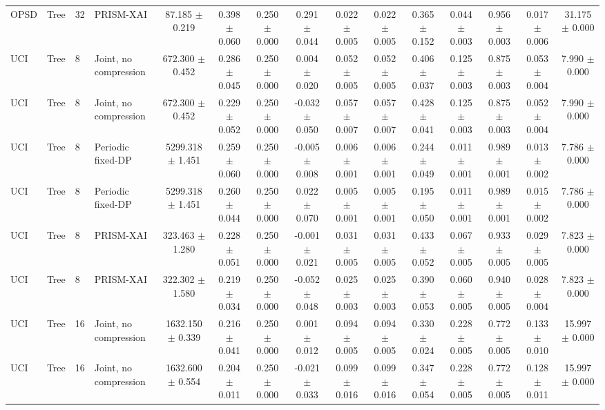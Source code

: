 \begin{tabular}{llllccccccccccc}
OPSD & Tree & 32 & PRISM-XAI & 87.185 $\pm$ 0.219 & 0.398 $\pm$ 0.060 & 0.250 $\pm$ 0.000 & 0.291 $\pm$ 0.044 & 0.022 $\pm$ 0.005 & 0.022 $\pm$ 0.005 & 0.365 $\pm$ 0.152 & 0.044 $\pm$ 0.003 & 0.956 $\pm$ 0.003 & 0.017 $\pm$ 0.006 & 31.175 $\pm$ 0.000 \\
UCI & Tree & 8 & Joint, no compression & 672.300 $\pm$ 0.452 & 0.286 $\pm$ 0.045 & 0.250 $\pm$ 0.000 & 0.004 $\pm$ 0.020 & 0.052 $\pm$ 0.005 & 0.052 $\pm$ 0.005 & 0.406 $\pm$ 0.037 & 0.125 $\pm$ 0.003 & 0.875 $\pm$ 0.003 & 0.053 $\pm$ 0.004 & 7.990 $\pm$ 0.000 \\
UCI & Tree & 8 & Joint, no compression & 672.300 $\pm$ 0.452 & 0.229 $\pm$ 0.052 & 0.250 $\pm$ 0.000 & -0.032 $\pm$ 0.050 & 0.057 $\pm$ 0.007 & 0.057 $\pm$ 0.007 & 0.428 $\pm$ 0.041 & 0.125 $\pm$ 0.003 & 0.875 $\pm$ 0.003 & 0.052 $\pm$ 0.004 & 7.990 $\pm$ 0.000 \\
UCI & Tree & 8 & Periodic fixed-DP & 5299.318 $\pm$ 1.451 & 0.259 $\pm$ 0.060 & 0.250 $\pm$ 0.000 & -0.005 $\pm$ 0.008 & 0.006 $\pm$ 0.001 & 0.006 $\pm$ 0.001 & 0.244 $\pm$ 0.049 & 0.011 $\pm$ 0.001 & 0.989 $\pm$ 0.001 & 0.013 $\pm$ 0.002 & 7.786 $\pm$ 0.000 \\
UCI & Tree & 8 & Periodic fixed-DP & 5299.318 $\pm$ 1.451 & 0.260 $\pm$ 0.044 & 0.250 $\pm$ 0.000 & 0.022 $\pm$ 0.070 & 0.005 $\pm$ 0.001 & 0.005 $\pm$ 0.001 & 0.195 $\pm$ 0.050 & 0.011 $\pm$ 0.001 & 0.989 $\pm$ 0.001 & 0.015 $\pm$ 0.002 & 7.786 $\pm$ 0.000 \\
UCI & Tree & 8 & PRISM-XAI & 323.463 $\pm$ 1.280 & 0.228 $\pm$ 0.051 & 0.250 $\pm$ 0.000 & -0.001 $\pm$ 0.021 & 0.031 $\pm$ 0.005 & 0.031 $\pm$ 0.005 & 0.433 $\pm$ 0.052 & 0.067 $\pm$ 0.005 & 0.933 $\pm$ 0.005 & 0.029 $\pm$ 0.005 & 7.823 $\pm$ 0.000 \\
UCI & Tree & 8 & PRISM-XAI & 322.302 $\pm$ 1.580 & 0.219 $\pm$ 0.034 & 0.250 $\pm$ 0.000 & -0.052 $\pm$ 0.048 & 0.025 $\pm$ 0.003 & 0.025 $\pm$ 0.003 & 0.390 $\pm$ 0.053 & 0.060 $\pm$ 0.005 & 0.940 $\pm$ 0.005 & 0.028 $\pm$ 0.004 & 7.823 $\pm$ 0.000 \\
UCI & Tree & 16 & Joint, no compression & 1632.150 $\pm$ 0.339 & 0.216 $\pm$ 0.041 & 0.250 $\pm$ 0.000 & 0.001 $\pm$ 0.012 & 0.094 $\pm$ 0.005 & 0.094 $\pm$ 0.005 & 0.330 $\pm$ 0.024 & 0.228 $\pm$ 0.005 & 0.772 $\pm$ 0.005 & 0.133 $\pm$ 0.010 & 15.997 $\pm$ 0.000 \\
UCI & Tree & 16 & Joint, no compression & 1632.600 $\pm$ 0.554 & 0.204 $\pm$ 0.011 & 0.250 $\pm$ 0.000 & -0.021 $\pm$ 0.033 & 0.099 $\pm$ 0.016 & 0.099 $\pm$ 0.016 & 0.347 $\pm$ 0.054 & 0.228 $\pm$ 0.005 & 0.772 $\pm$ 0.005 & 0.128 $\pm$ 0.011 & 15.997 $\pm$ 0.000 \\

\end{tabular}
